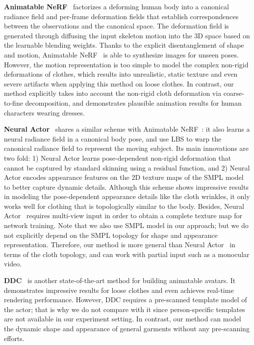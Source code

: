 \textbf{Animatable NeRF}~\cite{peng2021animatable_nerf} factorizes a deforming human body into a canonical radiance field and per-frame deformation fields that establish correspondences between the observations and the canonical space. 
The deformation field is generated through diffusing the input skeleton motion into the 3D space based on the learnable blending weights. 
Thanks to the explicit disentanglement of shape and motion, Animatable NeRF~\cite{peng2021animatable_nerf} is able to synthesize images for unseen poses. 
However, the motion representation is too simple to model the complex non-rigid deformations of clothes, which results into unrealistic, static texture and even severe artifacts when applying this method on loose clothes. In contrast, our method explicitly takes into account the non-rigid cloth deformation via coarse-to-fine decomposition, and demonstrates plausible animation results for human characters wearing dresses. 


\textbf{Neural Actor}~\cite{neural_actors} shares a similar scheme with Animatable NeRF~\cite{peng2021animatable_nerf}: it also learns a neural radiance field in a canonical body pose, and use LBS to warp the canonical radiance field to represent the moving subject. Its main innovations are two fold: 1) Neural Actor learns pose-dependent non-rigid deformation that cannot be captured by standard skinning using a residual function, and 2) Neural Actor encodes appearance features on the 2D texture maps of the SMPL model to better capture dynamic details. Although this scheme shows impressive results in modeling the pose-dependent appearance details like the cloth wrinkles, it only works well for clothing that is topologically similar to the body. Besides, Neural Actor~\cite{neural_actors} requires multi-view input in order to obtain a complete texture map for network training. 
Note that we also use SMPL model in our approach; but we do not explicitly depend on the SMPL topology for shape and appearance representation. Therefore, our method is more general than Neural Actor~\cite{neural_actors} in terms of the cloth topology, and can work with partial input such as a monocular video. 


\textbf{DDC}~\cite{habermann2021realtimeDDC} is another state-of-the-art method for building animatable avatars. It demonstrates impressive results for loose clothes and even achieves real-time rendering performance. However, DDC requires a pre-scanned template model of the actor; that is why we do not compare with it since person-specific templates are not available in our experiment setting. In contrast, our method can model the dynamic shape and appearance of general garments without any pre-scanning efforts.


